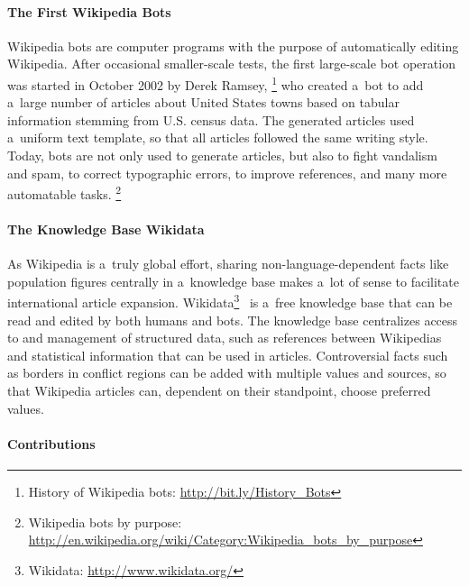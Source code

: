 \documentclass{sig-alternate}
\newcommand{\inlinelistingsize}{\fontsize{8pt}{11pt}}
\let\oldurl\url
\renewcommand{\url}[1]{\inlinelistingsize\oldurl{#1}}
\begin{document}
\paragraph{The First Wikipedia Bots}

Wikipedia bots are computer programs
with the purpose of automatically editing Wikipedia.
After occasional smaller-scale tests,
the first large-scale bot operation
was started in October 2002 by Derek Ramsey,%
\footnote{History of Wikipedia bots:
\url{http://bit.ly/History_Bots}}
who created a~bot to add a~large number
of articles about United States towns
based on tabular information
stemming from U.S. census data.
The generated articles used a~uniform
text template, so that all articles
followed the same writing style.
Today, bots are not only used to generate articles,
but also to fight vandalism and spam,
to correct typographic errors,
to improve references, and many more automatable tasks.%
\footnote{Wikipedia bots by purpose: \url{http://en.wikipedia.org/wiki/Category:Wikipedia_bots_by_purpose}}

\paragraph{The Knowledge Base Wikidata}

As Wikipedia is a~truly global effort,
sharing non-language-dependent facts
like population figures centrally
in a~knowledge base makes a~lot of sense
to facilitate international article expansion.
Wikidata\footnote{Wikidata: \url{http://www.wikidata.org/}}~\cite{vrandecic2012wikidata}
is a~free knowledge base that can be read
and edited by both humans and bots.
The knowledge base centralizes access to
and management of structured data,
such as references between Wikipedias
and statistical information that can be used in articles.
Controversial facts such as borders in conflict regions
can be added with multiple values and sources,
so that Wikipedia articles can,
dependent on their standpoint, choose preferred values.

\paragraph{Contributions}
\end{document}
